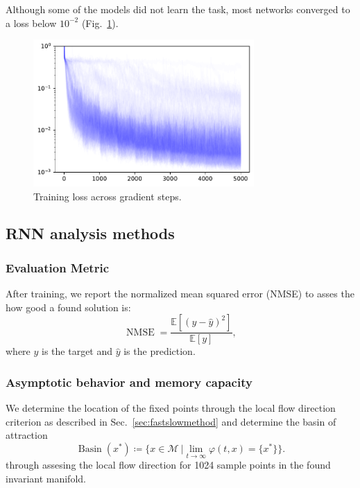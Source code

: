 \documentclass{article} %
\newcounter{ct}
\newcommand{\manifold}{\mathcal{M}}
\DeclareMathOperator{\basin}{Basin}
\theoremstyle{definition}
\theoremstyle{remark}
\begin{document}
Although some of the models did not learn the task, most networks converged to a loss below $10^{-2}$ (Fig.~\ref{fig:training_losses}).
 \begin{figure}[tbhp]
     \centering
    \includegraphics[width=0.75\textwidth]{training_losses}
       \caption{Training loss across gradient steps.}\label{fig:training_losses}
\end{figure}






\newpage
 \subsection{RNN analysis methods}


\subsubsection{Evaluation Metric}
After training, we report the normalized mean squared error (NMSE) to asses the how good a found solution is:
\begin{equation}
\operatorname{NMSE} = \frac{\mathbb{E}[(y-\hat y)^2]}{\mathbb{E}[y]},
\end{equation}
where \(y\) is the target and \(\hat y\) is the prediction.


\subsubsection{Asymptotic behavior and memory capacity}\label{sec:supp:asymbehav}
We determine the location of the fixed points through the local flow direction criterion as described in Sec.~\ref{sec:fastslowmethod}
and determine the basin of attraction
\begin{equation}
\basin(x^*) \coloneqq \{x\in \manifold \ | \lim_{t\rightarrow\infty}\varphi(t,x)=\{x^*\}\}.
\end{equation}
through assesing the local flow direction for 1024 sample points in the found invariant manifold.
\end{document}
